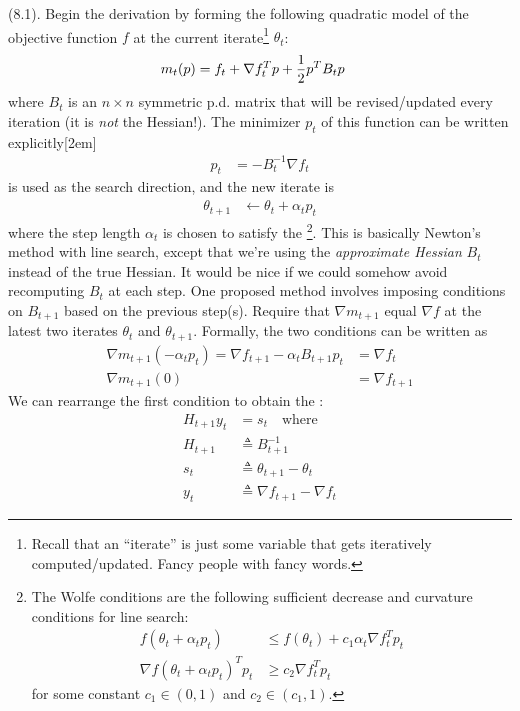 \documentclass[11pt]{article}
\begin{document}
\myspace
\p {} (8.1). Begin the derivation by forming the following quadratic model of the objective function $f$ at the current iterate\footnote{Recall that an ``iterate'' is just some variable that gets iteratively computed/updated. Fancy people with fancy words.} $\theta_t$:
\begin{align}
	m_t(p) &= f_t + \nabla f_t^T p + \frac{1}{2} p^T B_t p
\end{align} 
where $B_t$ is an $n \times n$ symmetric p.d. matrix that will be revised/updated every iteration (it is \textit{not} the Hessian!). The minimizer $p_t$ of this function can be written explicitly[2em]
\begin{align}
	p_t &= -B_t^{-1} \nabla f_t
\end{align}
is used as the search direction, and the new iterate is
\begin{align}
	\theta_{t + 1} &\leftarrow \theta_t + \alpha_t p_t
\end{align}
where the step length $\alpha_t$ is chosen to satisfy the \footnote{The Wolfe conditions are the following sufficient decrease and curvature conditions for line search:
\begin{align}
	f(\theta_t + \alpha_t p_t) &\le f(\theta_t) + c_1 \alpha_t \nabla f_t^T p_t \\
	\nabla f(\theta_t + \alpha_t p_t)^T p_t &\ge c_2 \nabla f_t^T p_t
\end{align}
for some constant $c_1 \in (0, 1)$ and $c_2 \in (c_1, 1)$. 
}. This is basically Newton's method with line search, except that we're using the \textit{approximate Hessian} $B_t$ instead of the true Hessian. It would be nice if we could somehow avoid recomputing $B_t$ at each step. One proposed method involves imposing conditions on $B_{t + 1}$ based on the previous step(s). Require that $\nabla m_{t + 1}$ equal $\nabla f$ at the latest two iterates $\theta_t$ and $\theta_{t + 1}$. Formally, the two conditions can be written as
\begin{align}
	\nabla m_{t + 1} (-\alpha_t p_t) = \nabla f_{t + 1} - \alpha_t B_{t + 1} p_t &= \nabla f_t \\
	\nabla m_{t + 1} (0) &= \nabla f_{t + 1}
\end{align}
We can rearrange the first condition to obtain the :
\begin{align}
	H_{t + 1} y_t &= s_t  \quad \text{where} \\
	H_{t + 1} &\triangleq B_{t + 1}^{-1} \\
	s_t &\triangleq \theta_{t + 1} - \theta_t \\
	y_t &\triangleq \nabla f_{t + 1} - \nabla f_t
\end{align}
\end{document}
